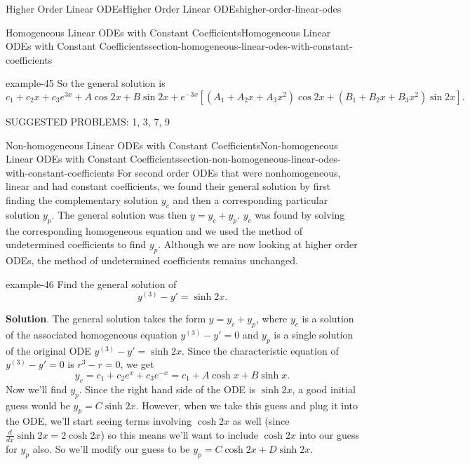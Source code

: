 \documentclass[oneside,10pt,]{book}
\numberwithin{equation}{section}
\newcommand{\brackets}[1]{\left[ #1 \right]}
\begin{document}
\begin{chapterptx}{Higher Order Linear ODEs}{}{Higher Order Linear ODEs}{}{}{higher-order-linear-odes}
\begin{sectionptx}{Homogeneous Linear ODEs with Constant Coefficients}{}{Homogeneous Linear ODEs with Constant Coefficients}{}{}{section-homogeneous-linear-odes-with-constant-coefficients}
\begin{example}{}{example-45}
\hypertarget{p-281}{}%
So the general solution is%
\begin{equation*}
c_{1}+c_{2}x+c_{3}e^{3x}+A\cos2x+B\sin2x+e^{-3x}\brackets{(A_{1}+A_{2}x+A_{3}x^{2})\cos2x+(B_{1}+B_{2}x+B_{3}x^{2})\sin2x}.
\end{equation*}
%
\end{example}
\begin{conclusion}{}%
\hypertarget{p-282}{}%
SUGGESTED PROBLEMS: 1, 3, 7, 9%
\end{conclusion}%
\end{sectionptx}
%
%
\typeout{************************************************}
\typeout{************************************************}
%
\begin{sectionptx}{Non-homogeneous Linear ODEs with Constant Coefficients}{}{Non-homogeneous Linear ODEs with Constant Coefficients}{}{}{section-non-homogeneous-linear-odes-with-constant-coefficients}
\hypertarget{p-283}{}%
For second order ODEs that were nonhomogeneous, linear and had constant coefficients, we found their general solution by first finding the complementary solution \(y_{c}\) and then a corresponding particular solution \(y_{p}\). The general solution was then \(y=y_{c}+y_{p}\). \(y_{c}\) was found by solving the corresponding homogeneous equation and we used the method of undetermined coefficients to find \(y_{p}\). Although we are now looking at higher order ODEs, the method of undetermined coefficients remains unchanged.%
\begin{example}{}{example-46}%
\hypertarget{p-284}{}%
Find the general solution of%
\begin{equation*}
y^{(3)}-y' = \sinh 2x.
\end{equation*}
%
\par\smallskip%
\noindent\textbf{Solution}.\hypertarget{solution-43}{}\quad%
\hypertarget{p-285}{}%
The general solution takes the form \(y = y_{c}+y_{p}\), where \(y_{c}\) is a solution of the associated homogeneous equation \(y^{(3)}-y'=0\) and \(y_{p}\) is a single solution of the original ODE \(y^{(3)}-y'=\sinh 2x\). Since the characteristic equation of \(y^{(3)}-y'=0\) is \(r^{3}-r=0\), we get%
\begin{equation*}
y_{c} = c_{1}+c_{2}e^{x}+c_{3}e^{-x} = c_{1}+A\cosh x+B\sinh x.
\end{equation*}
Now we'll find \(y_{p}\). Since the right hand side of the ODE is \(\sinh 2x\), a good initial guess would be \(y_{p} = C\sinh 2x\). However, when we take this guess and plug it into the ODE, we'll start seeing terms involving \(\cosh 2x\) as well (since \(\frac{d}{dx}\sinh 2x = 2\cosh 2x\)) so this means we'll want to include \(\cosh 2x\) into our guess for \(y_{p}\) also. So we'll modify our guess to be \(y_{p} = C\cosh 2x+D\sinh 2x\).%

\end{example}
\end{sectionptx}
\end{chapterptx}
\end{document}
